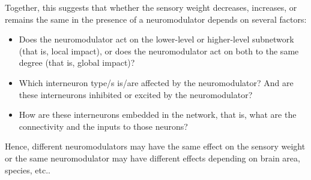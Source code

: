\documentclass[10pt,a4paper,draft]{article}
\begin{document}
Together, this suggests that whether the sensory weight decreases, increases, or remains the same in the presence of a neuromodulator depends on several factors:
%
\begin{itemize}
\item Does the neuromodulator act on the lower-level or higher-level subnetwork (that is, local impact), or does the neuromodulator act on both to the same degree (that is, global impact)?
\item Which interneuron type/s is/are affected by the neuromodulator? And are these interneurons inhibited or excited by the neuromodulator?
\item How are these interneurons embedded in the network, that is, what are the connectivity and the inputs to those neurons?
\end{itemize}
%
Hence, different neuromodulators may have the same effect on the sensory weight or the same neuromodulator may have different effects depending on brain area, species, etc..
\end{document}
